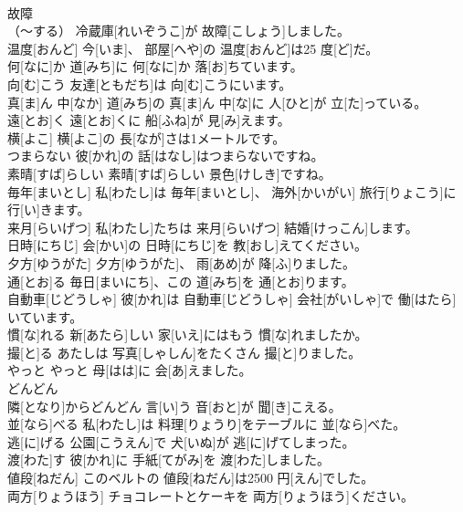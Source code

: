 \documentclass[8pt]{extreport}
\begin{document}
\begin{CJK}{UTF8}{min}
\\	故障
\\	[こしょう]（～する）	冷蔵庫[れいぞうこ]が 故障[こしょう]しました。		
\\	温度[おんど]	今[いま]、 部屋[へや]の 温度[おんど]は25 度[ど]だ。		
\\	何[なに]か	道[みち]に 何[なに]か 落[お]ちています。		
\\	向[む]こう	友達[ともだち]は 向[む]こうにいます。		
\\	真[ま]ん 中[なか]	道[みち]の 真[ま]ん 中[な]に 人[ひと]が 立[た]っている。		
\\	遠[とお]く	遠[とお]くに 船[ふね]が 見[み]えます。		
\\	横[よこ]	横[よこ]の 長[なが]さは1メートルです。		
\\	つまらない	彼[かれ]の 話[はなし]はつまらないですね。		
\\	素晴[すば]らしい	素晴[すば]らしい 景色[けしき]ですね。		
\\	毎年[まいとし]	私[わたし]は 毎年[まいとし]、 海外[かいがい] 旅行[りょこう]に 行[い]きます。		
\\	来月[らいげつ]	私[わたし]たちは 来月[らいげつ] 結婚[けっこん]します。		
\\	日時[にちじ]	会[かい]の 日時[にちじ]を 教[おし]えてください。		
\\	夕方[ゆうがた]	夕方[ゆうがた]、 雨[あめ]が 降[ふ]りました。		
\\	通[とお]る	毎日[まいにち]、この 道[みち]を 通[とお]ります。		
\\	自動車[じどうしゃ]	彼[かれ]は 自動車[じどうしゃ] 会社[がいしゃ]で 働[はたら]いています。		
\\	慣[な]れる	新[あたら]しい 家[いえ]にはもう 慣[な]れましたか。		
\\	撮[と]る	あたしは 写真[しゃしん]をたくさん 撮[と]りました。		
\\	やっと	やっと 母[はは]に 会[あ]えました。		
\\	どんどん 
\\	隣[となり]からどんどん 言[い]う 音[おと]が 聞[き]こえる。		
\\	並[なら]べる	私[わたし]は 料理[りょうり]をテーブルに 並[なら]べた。		
\\	逃[に]げる	公園[こうえん]で 犬[いぬ]が 逃[に]げてしまった。		
\\	渡[わた]す	彼[かれ]に 手紙[てがみ]を 渡[わた]しました。		
\\	値段[ねだん]	このベルトの 値段[ねだん]は2500 円[えん]でした。		
\\	両方[りょうほう]	チョコレートとケーキを 両方[りょうほう]ください。		

\end{CJK}
\end{document}
